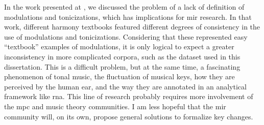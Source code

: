 
In the work presented at \textcite{napoleslopez2020local},
we discussed the problem of a lack of definition of
modulations and tonicizations, which has implications for
\gls{mir} research. In that work, different harmony
textbooks featured different degrees of consistency in the
use of modulations and tonicizations. Considering that these
represented  easy ``textbook'' examples of modulations, it
is only logical to expect a greater inconsistency in more
complicated corpora, such as the dataset used in this
dissertation. This is a difficult problem, but at the same
time, a fascinating phenomenon of tonal music, the
fluctuation of musical keys, how they are perceived by the
human ear, and the way they are annotated in an analytical
framework like \gls{rna}. This line of research probably
requires more involvement of the \gls{mpc} and music theory
communities. I am less hopeful that the \gls{mir} community
will, on its own, propose general solutions to formalize key
changes.
